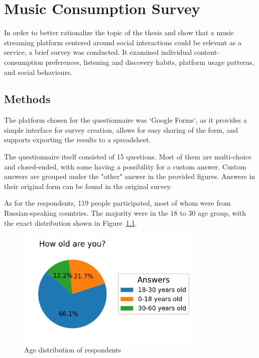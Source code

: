 \chapter{Music Consumption Survey}\label{chap:survey}

In order to better rationalize the topic of the thesis and show that a music streaming platform centered around social
interactions could be relevant as a service, a brief survey was conducted. It examined
individual content‐consumption preferences, listening and discovery habits, platform usage patterns, and
social behaviours.


\section{Methods}
The platform chosen for the questionnaire was `Google Forms`\cite{googleforms}, as it provides a simple interface for
survey creation, allows for easy sharing of the form, and supports exporting the results to a spreadsheet.

The questionnaire itself consisted of 15 questions.
Most of them are multi-choice and closed-ended, with some having a possibility for a custom answer.
Custom answers are grouped under the "other" answer in the provided figures. Answers in their original form
can be found in the original survey.

As for the respondents, 119 people participated, most of whom were from Russian-speaking countries.
The majority were in the 18 to 30 age group, with the exact distribution shown in Figure~\ref{fig:age}.

\begin{figure}[htbp]
    \centering
    \includegraphics[width=0.8\textwidth, keepaspectratio]{charts/age.png}
    \caption{Age distribution of respondents}
    \label{fig:age}
\end{figure}


